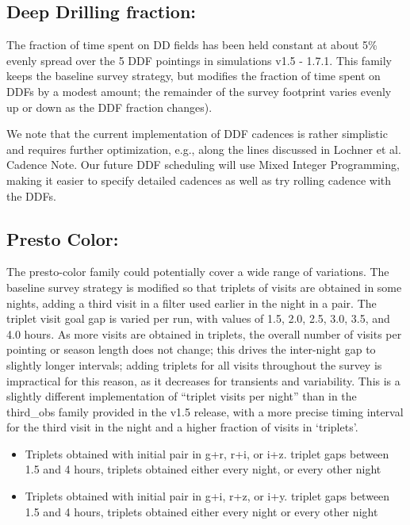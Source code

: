 \subsection{Deep Drilling fraction:}
The fraction of time spent on DD fields has been held constant at about 5\% evenly spread over the 5 DDF pointings in simulations v1.5 - 1.7.1. This family keeps the baseline survey strategy, but modifies the fraction of time spent on DDFs by a modest amount; the remainder of the survey footprint varies evenly up or down as the DDF fraction changes).

We note that the current implementation of DDF cadences is rather simplistic and requires further optimization, e.g., along the lines discussed in Lochner et al. Cadence Note. Our future DDF scheduling will use Mixed Integer Programming, making it easier to specify detailed cadences as well as try rolling cadence with the DDFs.

\subsection{Presto Color:}
The presto-color family could potentially cover a wide range of variations. The baseline survey strategy is modified so that triplets of visits are obtained in some nights, adding a third visit in a filter used earlier in the night in a pair. The triplet visit goal gap is varied per run, with values of 1.5, 2.0, 2.5, 3.0, 3.5, and 4.0 hours. As more visits are obtained in triplets, the overall number of visits per pointing or season length does not change; this drives the inter-night gap to slightly longer intervals; adding triplets for all visits throughout the survey is impractical for this reason, as it decreases for transients and variability. This is a slightly different implementation of “triplet visits per night” than in the third\_obs family provided in the v1.5 release, with a more precise timing interval for the third visit in the night and a higher fraction of visits in ‘triplets’.
\begin{itemize}
\item Triplets obtained with initial pair in g+r, r+i, or i+z. triplet gaps between 1.5 and 4 hours, triplets obtained either every night, or every other night
\item Triplets obtained with initial pair in g+i, r+z, or i+y. triplet gaps between 1.5 and 4 hours, triplets obtained either every night or every other night
\end{itemize}

